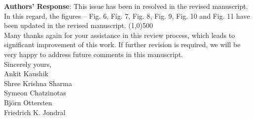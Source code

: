 \documentclass[12pt,a4wide,peerreview]{IEEEtran}
\begin{document}
\textbf{Authors' Response}:
This issue has been in resolved in the revised manuscript. In this regard, the figures -- Fig. 6, Fig. 7, Fig. 8, Fig. 9, Fig. 10 and Fig. 11 have been updated in the revised manuscript.   
\line(1,0){500} \\
Many thanks again for your assistance in this review process, which leads to significant improvement of this work. If further revision is required, we will be very happy to address future comments in this manuscript. \\
Sincerely yours,\\
\hspace{5 pt} Ankit Kaushik\\
\hspace{5 pt} Shree Krishna Sharma\\
\hspace{5 pt} Symeon Chatzinotas\\
\hspace{5 pt} Bj\"orn Ottersten\\
\hspace{5 pt} Friedrich K. Jondral \\
%


\end{document}
